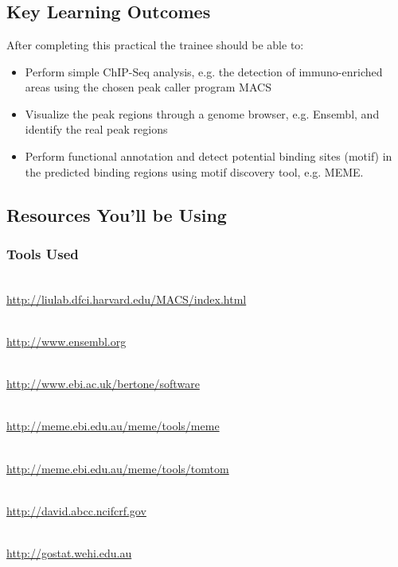 
\chapter{\moduleTitle}
\newpage

\section{Key Learning Outcomes}

After completing this practical the trainee should be able to:
\begin{itemize}
  \item Perform simple ChIP-Seq analysis, e.g. the detection of immuno-enriched areas using the chosen peak caller program MACS
  \item Visualize the peak regions through a genome browser, e.g. Ensembl, and identify the real peak regions
  \item Perform functional annotation and detect potential binding sites (motif) in the predicted binding regions using motif discovery tool, e.g. MEME.
\end{itemize}

\section{Resources You'll be Using}
 
\subsection{Tools Used}
\begin{description}[style=multiline,labelindent=0cm,align=left,leftmargin=0.5cm]
  \item[MACS]\hfill\\
  	\url{http://liulab.dfci.harvard.edu/MACS/index.html}
  \item[Ensembl]\hfill\\
  	\url{http://www.ensembl.org}
  \item[PeakAnalyzer]\hfill\\
  	\url{http://www.ebi.ac.uk/bertone/software}
  \item[MEME]\hfill\\
  	\url{http://meme.ebi.edu.au/meme/tools/meme}
  \item[TOMTOM]\hfill\\
  	\url{http://meme.ebi.edu.au/meme/tools/tomtom}  
  \item[DAVID]\hfill\\
  	\url{http://david.abcc.ncifcrf.gov}
  \item[GOstat]\hfill\\
    \url{http://gostat.wehi.edu.au}
\end{description}

